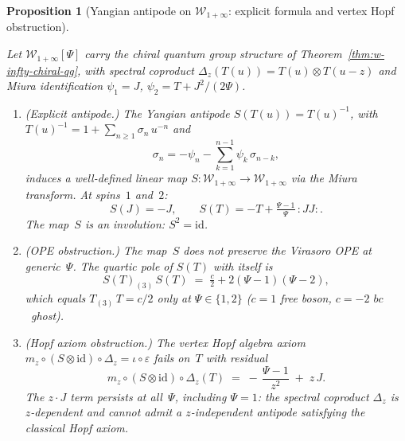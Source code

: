 \documentclass[11pt,reqno]{amsart}
\newtheorem{proposition}[theorem]{Proposition}
\theoremstyle{definition}
\theoremstyle{remark}
\newcommand{\cW}{\mathcal{W}}
\numberwithin{equation}{section}
\providecommand{\ClaimStatusProvedHere}{}
\begin{document}
\begin{proposition}[Yangian antipode on $\cW_{1+\infty}$:
explicit formula and vertex Hopf obstruction]
\label{prop:w-infty-antipode-obstruction}
\ClaimStatusProvedHere
Let $\cW_{1+\infty}[\Psi]$ carry the chiral quantum group
structure of Theorem~\textup{\ref{thm:w-infty-chiral-qg}},
with spectral coproduct
$\Delta_z(T(u)) = T(u) \otimes T(u-z)$ and Miura
identification $\psi_1 = J$,
$\psi_2 = T + J^2/(2\Psi)$.
\begin{enumerate}[label=\textup{(\roman*)}]
\item \textup{(Explicit antipode.)}
The Yangian antipode $S(T(u)) = T(u)^{-1}$, with
$T(u)^{-1} = 1 + \sum_{n \geq 1} \sigma_n\, u^{-n}$
and
\begin{equation}\label{eq:transfer-inverse-recurrence}
  \sigma_n
  = -\psi_n
  - \sum_{k=1}^{n-1} \psi_k\, \sigma_{n-k},
\end{equation}
induces a well-defined linear map
$S \colon \cW_{1+\infty} \to \cW_{1+\infty}$
via the Miura transform. At spins~$1$ and~$2$:
\begin{equation}\label{eq:w-infty-antipode-explicit}
  S(J) = -J,
  \qquad
  S(T) = -T
  + \tfrac{\Psi - 1}{\Psi}\,{:}JJ{:}.
\end{equation}
The map~$S$ is an involution: $S^2 = \mathrm{id}$.

\item \textup{(OPE obstruction.)}
The map~$S$ does not preserve the Virasoro OPE at generic~$\Psi$.
The quartic pole of $S(T)$ with itself is
\begin{equation}\label{eq:antipode-quartic-obstruction}
  S(T)_{(3)}\, S(T)
  \;=\;
  \tfrac{c}{2}
  + 2(\Psi - 1)(\Psi - 2),
\end{equation}
which equals $T_{(3)}\, T = c/2$ only at
$\Psi \in \{1, 2\}$
\textup{(}$c = 1$ free boson, $c = -2$ $bc$~ghost\textup{)}.

\item \textup{(Hopf axiom obstruction.)}
The vertex Hopf algebra axiom
$m_z \circ (S \otimes \mathrm{id}) \circ \Delta_z
= \iota \circ \varepsilon$
fails on~$T$ with residual
\begin{equation}\label{eq:antipode-hopf-obstruction}
  m_z \circ (S \otimes \mathrm{id})
  \circ \Delta_z(T)
  \;=\;
  -\,\frac{\Psi - 1}{z^2}
  \;+\; z\, J.
\end{equation}
The $z \cdot J$ term persists at all~$\Psi$, including
$\Psi = 1$: the spectral coproduct $\Delta_z$ is
$z$-dependent and cannot admit a $z$-independent
antipode satisfying the classical Hopf axiom.
\end{enumerate}
\end{proposition}
\end{document}
